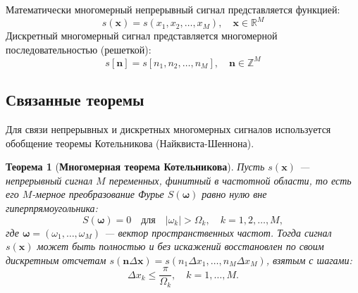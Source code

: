 \documentclass[12pt,a4paper]{article}
\newtheorem{theorem}{Теорема}
\begin{document}
Математически многомерный непрерывный сигнал представляется функцией:
$$ s(\mathbf{x}) = s(x_1, x_2, \dots, x_M), \quad \mathbf{x} \in \mathbb{R}^M $$
Дискретный многомерный сигнал представляется многомерной последовательностью (решеткой):
$$ s[\mathbf{n}] = s[n_1, n_2, \dots, n_M], \quad \mathbf{n} \in \mathbb{Z}^M $$

\subsection{Связанные теоремы}

Для связи непрерывных и дискретных многомерных сигналов используется обобщение теоремы Котельникова (Найквиста-Шеннона).

\begin{theorem}[\textbf{Многомерная теорема Котельникова}]
Пусть $s(\mathbf{x})$ — непрерывный сигнал $M$ переменных, финитный в частотной области, то есть его $M$-мерное преобразование Фурье $S(\boldsymbol{\omega})$ равно нулю вне гиперпрямоугольника:
$$ S(\boldsymbol{\omega}) = 0 \quad \text{для} \quad |\omega_k| > \Omega_k, \quad k = 1, 2, \dots, M, $$
где $\boldsymbol{\omega} = (\omega_1, \dots, \omega_M)$ — вектор пространственных частот.
Тогда сигнал $s(\mathbf{x})$ может быть полностью и без искажений восстановлен по своим дискретным отсчетам $s(\mathbf{n}\Delta\mathbf{x}) = s(n_1 \Delta x_1, \dots, n_M \Delta x_M)$, взятым с шагами:
$$ \Delta x_k \le \frac{\pi}{\Omega_k}, \quad k = 1, \dots, M. $$
\end{theorem}
\end{document}
